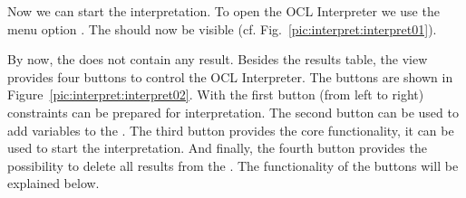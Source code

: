 Now we can start the interpretation. To open the \acs{OCL} Interpreter we use 
the menu option . The 
 should now be visible (cf. 
Fig.~\ref{pic:interpret:interpret01}).

By now, the  does not contain any result. Besides
the results table, the view provides four buttons to control the OCL
Interpreter. The buttons are shown in Figure~\ref{pic:interpret:interpret02}.
With the first button (from left to right) constraints can be prepared for 
interpretation. The second button can be used to add variables to the 
. The third button provides the core 
functionality, it can be used to start the interpretation. And finally, the 
fourth button provides the possibility to delete all results from the 
. The functionality of the buttons will be 
explained below.

